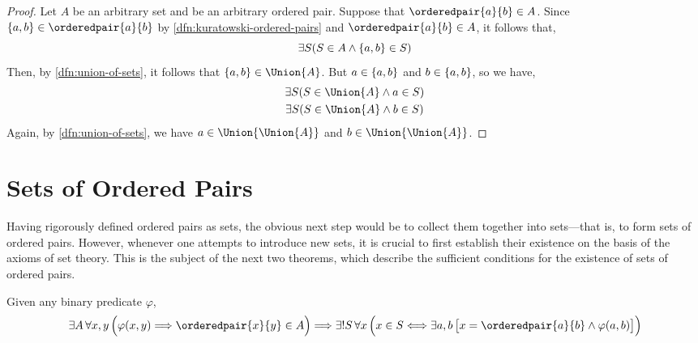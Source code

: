 \begin{proof}
    Let \( A \) be an arbitrary set and  be an arbitrary ordered pair.
    Suppose that \( \orderedpair{a}{b} \in A \).
    Since \( \mleft\{ a, b \mright\} \in \orderedpair{a}{b} \) by \cref{dfn:kuratowski-ordered-pairs}
    and \( \orderedpair{a}{b} \in A \), it follows that,
    \begin{equation*}
        \exists S  \mleft( S \in A \land \mleft\{ a, b \mright\} \in S \mright)
    \end{equation*}
    Then, by \cref{dfn:union-of-sets}, it follows that \( \mleft\{ a, b \mright\} \in \Union{A} \).
    But \( a \in \mleft\{ a, b \mright\} \) and \( b \in \mleft\{ a, b \mright\} \), so we have,
    \begin{gather*}
        \exists S  \mleft( S \in \Union{A} \land a \in S \mright) \\
        \exists S  \mleft( S \in \Union{A} \land b \in S \mright)
    \end{gather*}
    Again, by \cref{dfn:union-of-sets}, we have \( a \in \Union{\Union{A}} \) and
    \( b \in \Union{\Union{A}} \).
\end{proof}

\newpage
\section{Sets of Ordered Pairs}
Having rigorously defined ordered pairs as sets, the obvious next step would be to
collect them together into sets---that is, to form sets of ordered pairs.
However, whenever one attempts to introduce new sets, it is crucial to first establish
their existence on the basis of the axioms of set theory. This is the subject of the
next two theorems, which describe the sufficient conditions for the existence of sets of ordered pairs.

\begin{thm}
    \label{thm:sufficient-condition-for-the-existence-of-sets-of-ordered-pairs-1}
    Given any binary predicate \( \varphi \),
    \begin{equation*}
        \exists A \, \forall x,y \, \Big( \varphi(x,y) {\implies} \orderedpair{x}{y} \in A \Big)
        {\implies}
        \exists! S \, \forall x \, \Big( x \in S {\iff} \exists a,b \, \big[ x = \orderedpair{a}{b} \land \varphi(a,b) \big] \Big)
    \end{equation*}
\end{thm}


